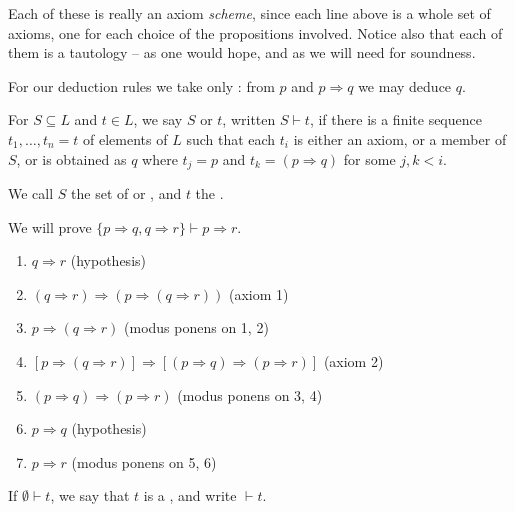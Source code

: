 \documentclass[a4paper]{scrartcl}
\begin{document}
Each of these is really an axiom \emph{scheme}, since each line above is a whole set of axioms, one for each choice of the propositions involved. Notice also that each of them is a tautology -- as one would hope, and as we will need for soundness.

For our deduction rules we take only : from $p$ and $p \Rightarrow q$ we may deduce $q$.

\begin{definition}
  For $S \subseteq L$ and $t \in L$, we say $S$  or  $t$, written $S \vdash t$, if there is a finite sequence $t_1, \dots, t_n = t$ of elements of $L$ such that each $t_i$ is either an axiom, or a member of $S$, or is obtained as $q$ where $t_j = p$ and $t_k = (p \Rightarrow q)$ for some $j, k < i$.

  We call $S$ the set of  or , and $t$ the .
\end{definition}

\begin{example}
  We will prove $\{p\Rightarrow q, q \Rightarrow r\} \vdash p \Rightarrow r$.
  \begin{enumerate}
    \item $q \Rightarrow r$ \hfill (hypothesis)
    \item $(q \Rightarrow r) \Rightarrow(p \Rightarrow(q \Rightarrow r))$ \hfill (axiom 1)
    \item $p \Rightarrow(q \Rightarrow r)$ \hfill (modus ponens on 1, 2)
    \item $[p \Rightarrow(q \Rightarrow r)] \Rightarrow[(p \Rightarrow q) \Rightarrow(p \Rightarrow r)]$ \hfill (axiom 2)
    \item $(p \Rightarrow q) \Rightarrow(p \Rightarrow r)$ \hfill (modus ponens on 3, 4)
    \item $p \Rightarrow q$ \hfill (hypothesis)
    \item $p \Rightarrow r$ \hfill (modus ponens on 5, 6)
  \end{enumerate}
\end{example}

\begin{definition}[Theorem]
  If $\emptyset \vdash t$, we say that $t$ is a , and write $\vdash t$.
\end{definition}
\end{document}
